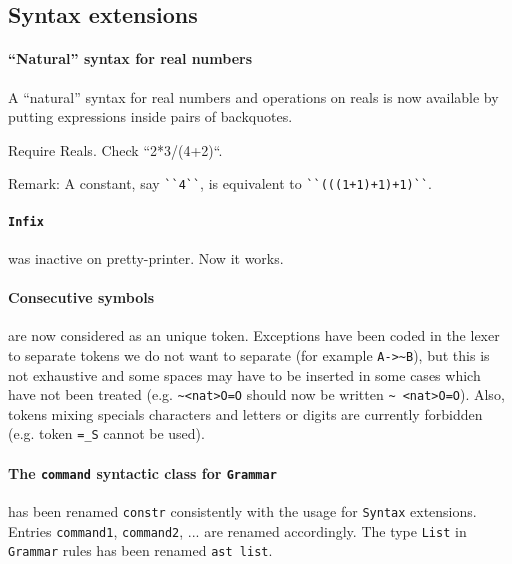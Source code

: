 \documentclass[11pt]{article}
\begin{document}
\subsection{Syntax extensions}
\label{SyntaxExtensions}

\paragraph{``Natural'' syntax for real numbers}

A ``natural'' syntax for real numbers and operations on reals is now
available by putting expressions inside pairs of backquotes.

\begin{coq_example}
Require Reals.
Check ``2*3/(4+2)``.
\end{coq_example}

Remark: A constant, say \verb:``4``:, is equivalent to
\verb:``(((1+1)+1)+1)``:.

\paragraph{{\tt Infix}} was inactive on pretty-printer. Now it works.

\paragraph{Consecutive symbols} are now considered as an unique token.
Exceptions have been coded in the lexer to separate tokens we do not want to
separate (for example \verb:A->~B:), but this is not exhaustive and some spaces
may have to be inserted in some cases which have not been treated
(e.g. \verb:~<nat>O=O: should now be written \verb:~ <nat>O=O:).
Also, tokens mixing specials characters and letters or digits
are currently forbidden (e.g. token \verb:=_S: cannot be used).


\paragraph{The {\tt command} syntactic class for {\tt Grammar}} has
been renamed {\tt constr} consistently with the usage for {\tt Syntax}
extensions. Entries {\tt command1}, {\tt command2}, ... are renamed
accordingly. The type {\tt List} in {\tt Grammar} rules has been
renamed {\tt ast list}.
\end{document}

